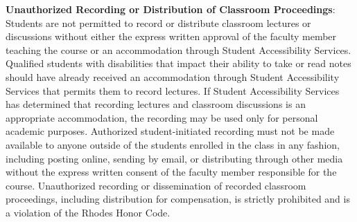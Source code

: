 \documentclass [letterpaper,11pt]{article}
\begin{document}
\begin{description}
\item \textbf{Unauthorized Recording or Distribution of Classroom Proceedings}: Students are not permitted to record or distribute classroom lectures or discussions without either the express written approval of the faculty member teaching the course or an accommodation through Student Accessibility Services. Qualified students with disabilities that impact their ability to take or read notes should have already received an accommodation through Student Accessibility Services that permits them to record lectures. If Student Accessibility Services has determined that recording lectures and classroom discussions is an appropriate accommodation, the recording may be used only for personal academic purposes. Authorized student-initiated recording must not be made available to anyone outside of the students enrolled in the class in any fashion, including posting online, sending by email, or distributing through other media without the express written consent of the faculty member responsible for the course. Unauthorized recording or dissemination of recorded classroom proceedings, including distribution for compensation, is strictly prohibited and is a violation of the Rhodes Honor Code.



\end{description}
\end{document}
